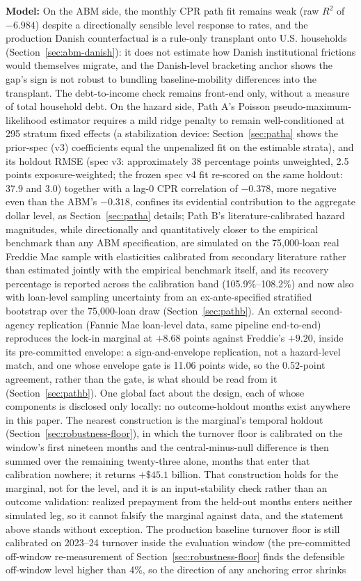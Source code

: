\documentclass[12pt]{article}
\begin{document}
\textbf{Model:} On the ABM side, the monthly CPR path fit remains weak (raw $R^2$ of $-6.984$) despite a directionally sensible level response to rates, and the production Danish counterfactual is a rule-only transplant onto U.S. households (Section~\ref{sec:abm-danish}): it does not estimate how Danish institutional frictions would themselves migrate, and the Danish-level bracketing anchor shows the gap's sign is not robust to bundling baseline-mobility differences into the transplant. The debt-to-income check remains front-end only, without a measure of total household debt. On the hazard side, Path A's Poisson pseudo-maximum-likelihood estimator requires a mild ridge penalty to remain well-conditioned at 295 stratum fixed effects (a stabilization device: Section~\ref{sec:patha} shows the prior-spec (v3) coefficients equal the unpenalized fit on the estimable strata), and its holdout RMSE (spec v3: approximately 38 percentage points unweighted, 2.5 points exposure-weighted; the frozen spec v4 fit re-scored on the same holdout: 37.9 and 3.0) together with a lag-0 CPR correlation of $-0.378$, more negative even than the ABM's $-0.318$, confines its evidential contribution to the aggregate dollar level, as Section~\ref{sec:patha} details; Path B's literature-calibrated hazard magnitudes, while directionally and quantitatively closer to the empirical benchmark than any ABM specification, are simulated on the 75,000-loan real Freddie Mac sample with elasticities calibrated from secondary literature rather than estimated jointly with the empirical benchmark itself, and its recovery percentage is reported across the calibration band (105.9\%--108.2\%) and now also with loan-level sampling uncertainty from an ex-ante-specified stratified bootstrap over the 75,000-loan draw (Section~\ref{sec:pathb}). An external second-agency replication (Fannie Mae loan-level data, same pipeline end-to-end) reproduces the lock-in marginal at $+8.68$ points against Freddie's $+9.20$, inside its pre-committed envelope: a sign-and-envelope replication, not a hazard-level match, and one whose envelope gate is 11.06 points wide, so the 0.52-point agreement, rather than the gate, is what should be read from it (Section~\ref{sec:pathb}). One global fact about the design, each of whose components is disclosed only locally: no outcome-holdout months exist anywhere in this paper. The nearest construction is the marginal's temporal holdout (Section~\ref{sec:robustness-floor}), in which the turnover floor is calibrated on the window's first nineteen months and the central-minus-null difference is then summed over the remaining twenty-three alone, months that enter that calibration nowhere; it returns $+\$45.1$ billion. That construction holds for the marginal, not for the level, and it is an input-stability check rather than an outcome validation: realized prepayment from the held-out months enters neither simulated leg, so it cannot falsify the marginal against data, and the statement above stands without exception. The production baseline turnover floor is still calibrated on 2023--24 turnover inside the evaluation window (the pre-committed off-window re-measurement of Section~\ref{sec:robustness-floor} finds the defensible off-window level higher than 4\%, so the direction of any anchoring error shrinks 
\end{document}

